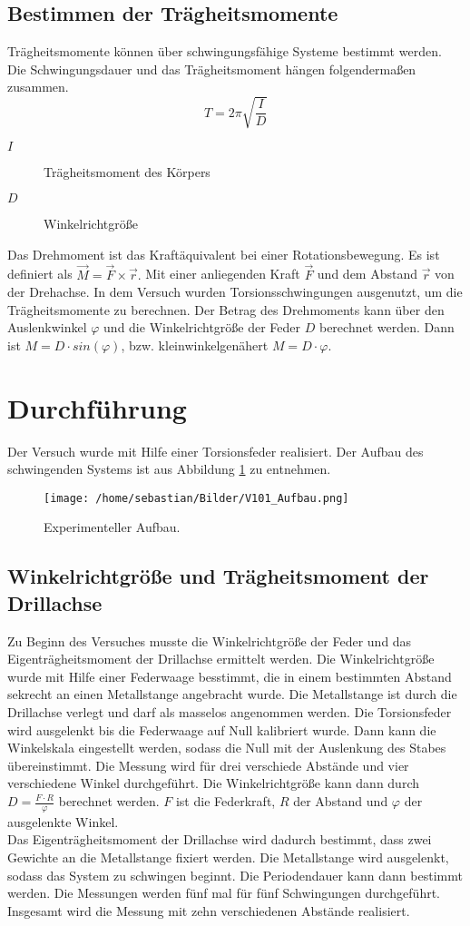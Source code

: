 \documentclass[parskip=half, bibliography=totoc]{scrartcl}
\begin{document}
\subsection{Bestimmen der Trägheitsmomente}
Trägheitsmomente können über schwingungsfähige Systeme bestimmt werden. Die Schwingungsdauer und das Trägheitsmoment hängen folgendermaßen zusammen.
\begin{equation*}
  T = 2\pi \sqrt{\frac{I}{D}}
\end{equation*}
\begin{description}
  \item[$I$]Trägheitsmoment des Körpers
  \item[$D$]Winkelrichtgröße
\end{description}
Das Drehmoment ist das Kraftäquivalent bei einer Rotationsbewegung. Es ist definiert als $\vec{M} = \vec{F} \times \vec{r}.$ Mit einer anliegenden Kraft $\vec{F}$ und dem Abstand $\vec{r}$ von der Drehachse.
In dem Versuch wurden Torsionsschwingungen ausgenutzt, um die Trägheitsmomente zu berechnen. Der Betrag des Drehmoments kann über den Auslenkwinkel $\varphi$ und die Winkelrichtgröße der Feder $D$ berechnet werden. Dann ist $M = D\cdot sin(\varphi)$, bzw. kleinwinkelgenähert $M = D\cdot\varphi$.
\section{Durchführung}
Der Versuch wurde mit Hilfe einer Torsionsfeder realisiert. Der Aufbau des schwingenden Systems ist aus Abbildung \ref{fig:Aufbau} zu entnehmen.
\begin{figure}
  \centering
  \texttt{[image: /home/sebastian/Bilder/V101\_Aufbau.png]}
  \caption{Experimenteller Aufbau.\cite{anleitung01}\protect}
  \label{fig:Aufbau}
\end{figure}
\FloatBarrier
\subsection{Winkelrichtgröße und Trägheitsmoment der Drillachse}
Zu Beginn des Versuches musste die Winkelrichtgröße der Feder und das Eigenträgheitsmoment der Drillachse ermittelt werden. Die Winkelrichtgröße wurde mit Hilfe einer Federwaage besstimmt, die in einem bestimmten Abstand sekrecht an einen Metallstange angebracht wurde. Die Metallstange ist durch die Drillachse verlegt und darf als masselos angenommen werden. Die Torsionsfeder wird ausgelenkt bis die Federwaage auf Null kalibriert wurde. Dann kann die Winkelskala eingestellt werden, sodass die Null mit der Auslenkung des Stabes übereinstimmt. Die Messung wird für drei verschiede Abstände und vier verschiedene Winkel durchgeführt. Die Winkelrichtgröße kann dann durch $D = \frac{F\cdot R}{\varphi}$ berechnet werden. $F$ ist die Federkraft, $R$ der Abstand und $\varphi$ der ausgelenkte Winkel.\\
Das Eigenträgheitsmoment der Drillachse wird dadurch bestimmt, dass zwei Gewichte an die Metallstange fixiert werden. Die Metallstange wird ausgelenkt, sodass das System zu schwingen beginnt. Die Periodendauer kann dann bestimmt werden. Die Messungen werden fünf mal für fünf Schwingungen durchgeführt. Insgesamt wird die Messung mit zehn verschiedenen Abstände realisiert.
\end{document}
